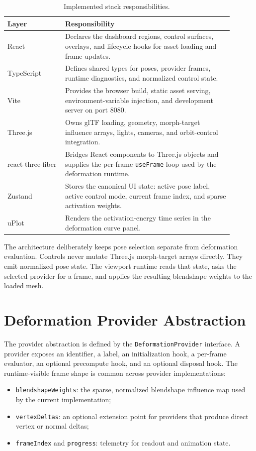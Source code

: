 \documentclass[11pt]{article}
\newcommand{\code}[1]{\texttt{#1}}
\begin{document}
\begin{table}[ht]
\centering
\begin{tabular}{@{}p{0.23\linewidth}p{0.67\linewidth}@{}}
\toprule
Layer & Responsibility \\
\midrule
React & Declares the dashboard regions, control surfaces, overlays, and lifecycle hooks for asset loading and frame updates. \\
TypeScript & Defines shared types for poses, provider frames, runtime diagnostics, and normalized control state. \\
Vite & Provides the browser build, static asset serving, environment-variable injection, and development server on port 8080. \\
Three.js & Owns glTF loading, geometry, morph-target influence arrays, lights, cameras, and orbit-control integration. \\
react-three-fiber & Bridges React components to Three.js objects and supplies the per-frame \code{useFrame} loop used by the deformation runtime. \\
Zustand & Stores the canonical UI state: active pose label, active control mode, current frame index, and sparse activation weights. \\
uPlot & Renders the activation-energy time series in the deformation curve panel. \\
\bottomrule
\end{tabular}
\caption{Implemented stack responsibilities.}
\label{tab:stack}
\end{table}

The architecture deliberately keeps pose selection separate from deformation evaluation.  Controls never mutate Three.js morph-target arrays directly.  They emit normalized pose state.  The viewport runtime reads that state, asks the selected provider for a frame, and applies the resulting blendshape weights to the loaded mesh.

\section{Deformation Provider Abstraction}

The provider abstraction is defined by the \code{DeformationProvider} interface.  A provider exposes an identifier, a label, an initialization hook, a per-frame evaluator, an optional precompute hook, and an optional disposal hook.  The runtime-visible frame shape is common across provider implementations:
\begin{itemize}[leftmargin=*]
  \item \code{blendshapeWeights}: the sparse, normalized blendshape influence map used by the current implementation;
  \item \code{vertexDeltas}: an optional extension point for providers that produce direct vertex or normal deltas;
  \item \code{frameIndex} and \code{progress}: telemetry for readout and animation state.
\end{itemize}
\end{document}
